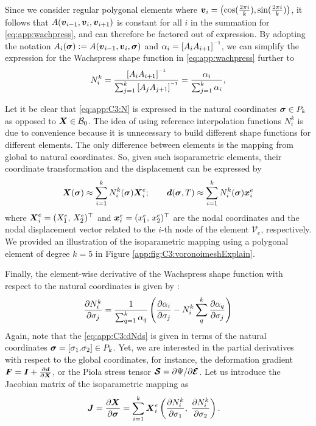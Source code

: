 %
Since we consider regular polygonal elements where ${\boldsymbol{v}}_i = \left(\cos(\frac{2\pi i}{k}), \sin(\frac{2\pi i}{k}) \right)$, it follows that $A({\boldsymbol{v}}_{i-1}, {\boldsymbol{v}}_{i}, {\boldsymbol{v}}_{i+1})$ is constant for all $i$ in the summation for \eqref{eq:app:wachpress}, and can therefore be factored out of expression. By adopting the notation $A_i(\boldsymbol{\sigma}):= A({\boldsymbol{v}}_{i-1},{\boldsymbol{v}}_{i},\boldsymbol{\sigma})$ and $\alpha_i = \left[A_i A_{i+1}\right]\inv$, we can simplify the expression for the Wachspress shape function in \eqref{eq:app:wachpress} further to
%
\begin{equation}
N^k_i= \frac{\left[A_{i} A_{i+1}\right]\inv}{\sum_{j=1}^k \left[A_{j} A_{j+1}\right]\inv} = \frac{\alpha_i }{\sum_{j=1}^k \alpha_i},
\label{eq:app:C3:N}
\end{equation}
%
\begin{rmk}
Let it be clear that \eqref{eq:app:C3:N} is expressed in the natural coordinates $\boldsymbol{\sigma} \in P_k$ as opposed to ${\boldsymbol{X}} \in \mathcal{B}_0$. The idea of using reference interpolation functions $N^k_i$ is due to convenience because it is unnecessary to build different shape functions for different elements. The only difference between elements is the mapping from global to natural coordinates. So, given such isoparametric elements, their coordinate transformation and the displacement can be expressed by
%
\begin{equation*}
{\boldsymbol{X}}(\boldsymbol{\sigma}) \approx \sum^{k}_{i=1} N_{i}^k(\boldsymbol{\sigma}) {\boldsymbol{X}}_i^e;  \quad \quad
{\boldsymbol{d}}(\boldsymbol{\sigma},T) \approx \sum^{k}_{i=1} N_{i}^k(\boldsymbol{\sigma}) {\boldsymbol{x}}_i^e 
\end{equation*}
%  
where ${\boldsymbol{X}}_{i}^{e} = (X^e_1,\, X^e_2)^\top$ and ${\boldsymbol{x}}_{i}^{e} = (x^e_1,\, x^e_2)^\top$ are the nodal coordinates and the nodal displacement vector related to the $i$-th node of the element $\mathcal{V}_e$, respectively. We provided an illustration of the isoparametric mapping using a polygonal element of degree $k=5$ in Figure \ref{app:fig:C3:voronoimeshExplain}.
\end{rmk}

Finally, the element-wise derivative of the Wachspress shape function with respect to the natural coordinates is given by \cite{Talischi2012Mar}:
%
\begin{equation}
\frac{\partial N^k_i}{\partial \sigma_j}= \frac{1}{\sum_{q=1}^k \alpha_q} \left(\frac{\partial \alpha_i}{\partial \sigma_j} - N_{i}^k \sum^{k}_q \frac{\partial \alpha_q}{\partial \sigma_j} \right)
\label{eq:app:C3:dNds}
\end{equation}
%
Again, note that the \eqref{eq:app:C3:dNds} is given in terms of the natural coordinates $\boldsymbol{\sigma} = [\sigma_1. \sigma_2] \in P_k$. Yet, we are interested in the partial derivatives with respect to the global coordinates, for instance, the deformation gradient ${\boldsymbol{F}} = \boldsymbol{I} + \frac{\partial {\boldsymbol{d}} }{\partial \boldsymbol{X}}$, or the Piola stress tensor $\boldsymbol{\mathcal{S}} = \partial \Psi / \partial \boldsymbol{\mathcal{E}}$. Let us introduce the Jacobian matrix of the isoparametric mapping as
%
\begin{align}
{\boldsymbol{J}} & = \frac{\partial {\boldsymbol{X}}}{\partial \boldsymbol{\sigma}} = \sum_{i=1}^k {\boldsymbol{X}}_i^{e} \left(\frac{\partial N^k_i}{\partial \sigma_1}, \; \frac{\partial N^k_i}{\partial \sigma_2} \right).
\end{align}
%
